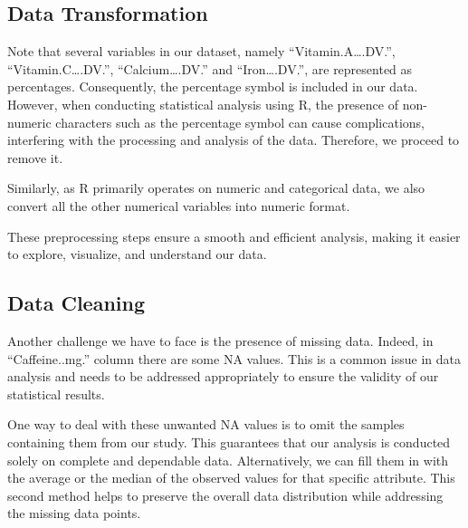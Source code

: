 \documentclass[
]{article}
\newenvironment{Shaded}{\begin{snugshade}}{\end{snugshade}}
\newcommand{\CommentTok}[1]{\textcolor[rgb]{0.56,0.35,0.01}{\textit{#1}}}
\newcommand{\FunctionTok}[1]{\textcolor[rgb]{0.13,0.29,0.53}{\textbf{#1}}}
\newcommand{\NormalTok}[1]{#1}
\newcommand{\OtherTok}[1]{\textcolor[rgb]{0.56,0.35,0.01}{#1}}
\newcommand{\SpecialCharTok}[1]{\textcolor[rgb]{0.81,0.36,0.00}{\textbf{#1}}}
\newcommand{\StringTok}[1]{\textcolor[rgb]{0.31,0.60,0.02}{#1}}
\begin{document}
\hypertarget{data-transformation}{%
\subsection{Data Transformation}\label{data-transformation}}

Note that several variables in our dataset, namely
``Vitamin.A\ldots.DV.'', ``Vitamin.C\ldots.DV.'', ``Calcium\ldots.DV.''
and ``Iron\ldots.DV.'', are represented as percentages. Consequently,
the percentage symbol is included in our data. However, when conducting
statistical analysis using R, the presence of non-numeric characters
such as the percentage symbol can cause complications, interfering with
the processing and analysis of the data. Therefore, we proceed to remove
it.

Similarly, as R primarily operates on numeric and categorical data, we
also convert all the other numerical variables into numeric format.

These preprocessing steps ensure a smooth and efficient analysis, making
it easier to explore, visualize, and understand our data.

\begin{Shaded}
\end{Shaded}

\hypertarget{data-cleaning}{%
\subsection{Data Cleaning}\label{data-cleaning}}

Another challenge we have to face is the presence of missing data.
Indeed, in ``Caffeine..mg.'' column there are some NA values. This is a
common issue in data analysis and needs to be addressed appropriately to
ensure the validity of our statistical results.

One way to deal with these unwanted NA values is to omit the samples
containing them from our study. This guarantees that our analysis is
conducted solely on complete and dependable data. Alternatively, we can
fill them in with the average or the median of the observed values for
that specific attribute. This second method helps to preserve the
overall data distribution while addressing the missing data points.
\end{document}
